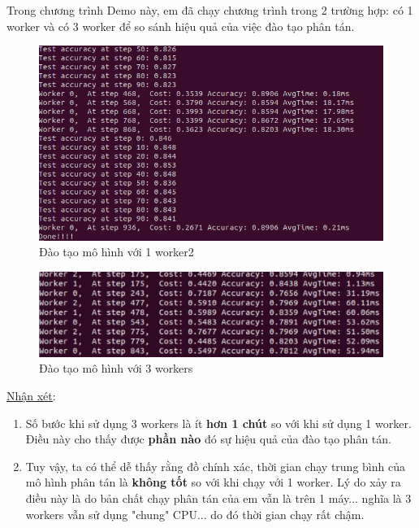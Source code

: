 \documentclass[11pt,a4paper]{article}
\numberwithin{equation}{subsection}
\numberwithin{figure}{subsection}
\numberwithin{table}{subsection}
\begin{document}
Trong chương trình Demo này, em đã chạy chương trình trong 2 trường hợp:  có 1 worker và có 3 worker để so sánh hiệu quả của việc đào tạo phân tán.\\

\begin{figure}[!h]
	\begin{center}
		\includegraphics[scale=0.615]{Dis_1.PNG}
	\end{center}
	\caption{Đào tạo mô hình với 1 worker2}
\end{figure}

\begin{figure}[!h]
	\begin{center}
		\includegraphics[scale=0.5]{Dis_2.PNG}
	\end{center}
	\caption{Đào tạo mô hình với 3 workers}
\end{figure}

\underline{Nhận xét}: 
\begin{enumerate}[-]
	\item Số bước khi sử dụng 3 workers là ít \textbf{hơn 1 chút} so với khi sử dụng 1 worker. Điều này cho thấy được \textbf{phần nào} đó sự hiệu quả của đào tạo phân tán.
	\item Tuy vậy, ta có thể dễ thấy rằng đồ chính xác, thời gian chạy trung bình của mô hình phân tán là \textbf{không tốt} so với khi chạy với 1 worker. Lý do xảy ra điều này là do bản chất chạy phân tán của em vẫn là trên 1 máy... nghĩa là 3 workers vẫn sử dụng "chung" CPU... do đó thời gian chạy rất chậm.
\end{enumerate}
\end{document}
